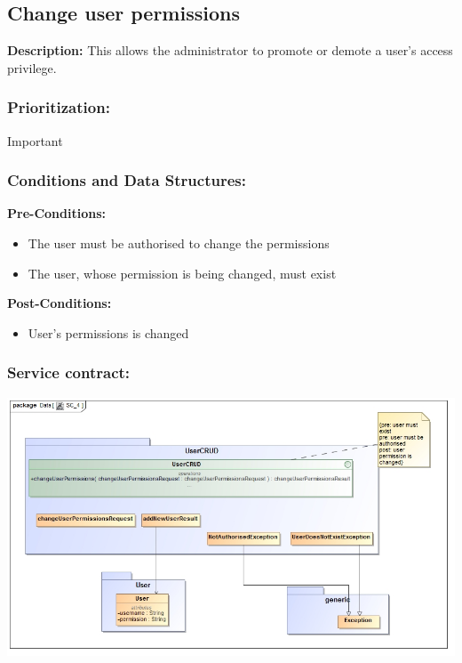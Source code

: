 \subsection{Change user permissions}
\textbf{Description:}
This allows the administrator to promote or demote a user's access privilege.
\subsubsection{Prioritization:}
Important
\subsubsection{Conditions and Data Structures:}
\textbf{Pre-Conditions:}
	\begin{itemize}
	\item The user must be authorised to change the permissions
	\item The user, whose permission is being changed, must exist
	\end{itemize}
\textbf{Post-Conditions:}
	\begin{itemize}
	\item User's permissions is changed
	\end{itemize}	
\subsubsection{Service contract:}
\includegraphics[width=1\linewidth]{./Graphics/5.jpg}

